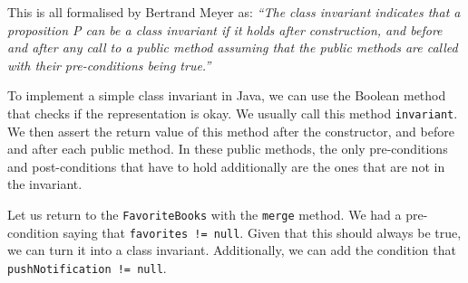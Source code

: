 This is all formalised by Bertrand Meyer as: \emph{``The class invariant
indicates that a proposition P can be a class invariant if it holds
after construction, and before and after any call to a public method
assuming that the public methods are called with their pre-conditions
being true.''}

To implement a simple class invariant in Java, we can use the Boolean
method that checks if the representation is okay. We usually call this
method \texttt{invariant}. We then assert the return value of this
method after the constructor, and before and after each public method.
In these public methods, the only pre-conditions and post-conditions
that have to hold additionally are the ones that are not in the
invariant.

Let us return to the \texttt{FavoriteBooks} with the \texttt{merge}
method. We had a pre-condition saying that \texttt{favorites\ !=\ null}.
Given that this should always be true, we can turn it into a class
invariant. Additionally, we can add the condition that
\texttt{pushNotification\ !=\ null}.

